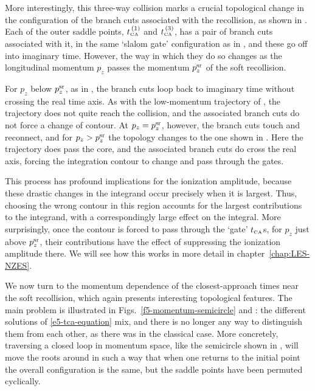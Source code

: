 More interestingly, this three-way collision marks a crucial topological change in the configuration of the branch cuts associated with the recollision, as shown in . Each of the outer saddle points, ${t_{\scriptscriptstyle\mathrm{CA}}^{{\,(1)}}}$ and ${t_{\scriptscriptstyle\mathrm{CA}}^{{\,(3)}}}$, has a pair of branch cuts associated with it, in the same `slalom gate' configuration as in , and these go off into imaginary time. However, the way in which they do so changes as the longitudinal momentum $p_z$ passes the momentum $p_z^{\mathrm{sr}}$ of the soft recollision.


For $p_z$ below $p_z^{\mathrm{sr}}$, as in , the branch cuts loop back to imaginary time without crossing the real time axis. As with the low-momentum trajectory of , the trajectory does not quite reach the collision, and the associated branch cuts do not force a change of contour. At $p_z=p_z^{\mathrm{sr}}$, however, the branch cuts touch and reconnect, and for $p_z>p_z^{\mathrm{sr}}$ the topology changes to the one shown in . Here the trajectory does pass the core, and the associated branch cuts do cross the real axis, forcing the integration contour to change and pass through the gates.


This process has profound implications for the ionization amplitude, because these drastic changes in the integrand occur precisely when it is largest. Thus, choosing the wrong contour in this region accounts for the largest contributions to the integrand, with a correspondingly large effect on the integral. More surprisingly, once the contour is forced to pass through the `gate' ${t_{\scriptscriptstyle\mathrm{CA}}}$s, for $p_z$ just above $p_z^{\mathrm{sr}}$, their contributions have the effect of suppressing the ionization amplitude there. We will see how this works in more detail in chapter~\ref{chap:LES-NZES}.


We now turn to the momentum dependence of the closest-approach times near the soft recollision, which again presents interesting topological features. The main problem is illustrated in Figs.~\ref{f5-momentum-semicircle} and : the different solutions of \eqref{e5-tca-equation} mix, and there is no longer any way to distinguish them from each other, as there was in the classical case. More concretely, traversing a closed loop in momentum space, like the semicircle shown in , will move the roots around in such a way that when one returns to the initial point the overall configuration is the same, but the saddle points have been permuted cyclically.

